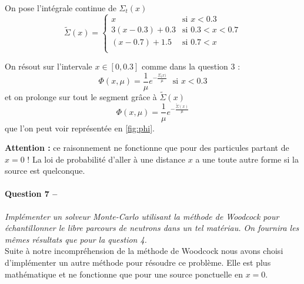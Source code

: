 \documentclass[11pt,a4paper]{article}
\newcommand{\question}[2]{\paragraph{Question #1 --}\hspace{-7pt}\textit{#2} \\}
\newcommand{\intsigma}{\widetilde{\Sigma}}
\begin{document}
On pose l'intégrale continue de $\Sigma_t(x)$ 
\begin{equation}
  \intsigma(x) =
  \begin{cases}
    x &\mbox{si } x<0.3 \\
    3(x-0.3)+0.3 &\mbox{si } 0.3<x<0.7 \\
    (x-0.7)+1.5 &\mbox{si } 0.7<x \\
  \end{cases}
\end{equation}

On résout sur l'intervale $x\in[0,0.3]$ comme dans la question 3 :
\begin{equation}
  \Phi(x, \mu) = \frac{1}{\mu} e^{-\frac{\Sigma_t x)}{\mu}} ~~~ \mbox{si } x<0.3
\end{equation}
et on prolonge sur tout le segment grâce à $\intsigma(x)$ 
\begin{equation}
  \Phi(x, \mu) = \frac{1}{\mu} e^{-\frac{\intsigma(x)}{\mu}} 
\end{equation}
que l'on peut voir représentée en \autoref{fig:phi}.



\textbf{Attention : } ce raisonnement ne fonctionne que pour des particules partant de $x=0$ ! La loi de probabilité d'aller à une distance $x$ a une toute autre forme si la source est quelconque.

\question{7}{Implémenter un solveur Monte-Carlo utilisant la méthode de Woodcock pour échantillonner le libre parcours de neutrons dans un tel matériau. On fournira les mêmes résultats que pour la question 4.}

Suite à notre incompréhension de la méthode de Woodcock nous avons choisi d'implémenter un autre méthode pour résoudre ce problème. Elle est plus mathématique et ne fonctionne que pour une source ponctuelle en $x=0$.
\end{document}
